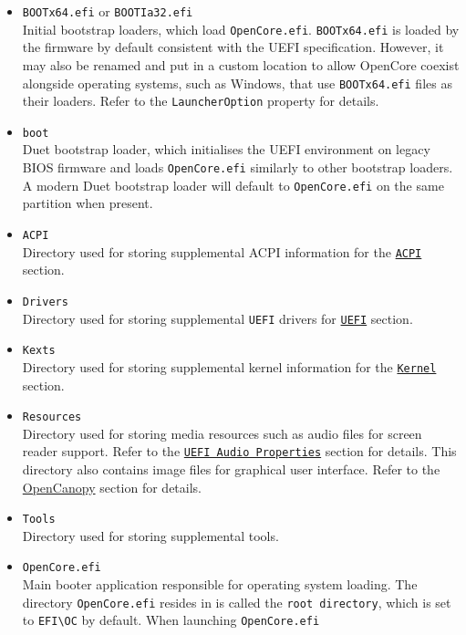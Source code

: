 \documentclass[]{article}
\providecommand{\tightlist}{%
  \setlength{\itemsep}{0pt}\setlength{\parskip}{0pt}}
\begin{document}
\begin{itemize}
\tightlist
\item
  \texttt{BOOTx64.efi} or \texttt{BOOTIa32.efi} \\
  Initial bootstrap loaders, which load \texttt{OpenCore.efi}. \texttt{BOOTx64.efi}
  is loaded by the firmware by default consistent with the UEFI specification. However,
  it may also be renamed and put in a custom location to allow OpenCore coexist alongside
  operating systems, such as Windows, that use \texttt{BOOTx64.efi} files as their loaders.
  Refer to the \texttt{LauncherOption} property for details.
\item
  \texttt{boot} \\
  Duet bootstrap loader, which initialises the UEFI environment on legacy BIOS firmware
  and loads \texttt{OpenCore.efi} similarly to other bootstrap loaders. A modern Duet
  bootstrap loader will default to \texttt{OpenCore.efi} on the same partition when
  present.
\item
  \texttt{ACPI} \\
  Directory used for storing supplemental ACPI information
  for the \hyperref[acpi]{\texttt{ACPI}} section.
\item
  \texttt{Drivers} \\
  Directory used for storing supplemental \texttt{UEFI}
  drivers for \hyperref[uefi]{\texttt{UEFI}} section.
\item
  \texttt{Kexts} \\
  Directory used for storing supplemental kernel information
  for the \hyperref[kernel]{\texttt{Kernel}} section.
\item
  \texttt{Resources} \\
  Directory used for storing media resources such as audio files
  for screen reader support. Refer to the \hyperref[uefiaudioprops]{\texttt{UEFI Audio Properties}}
  section for details. This directory also contains image files
  for graphical user interface. Refer to the \hyperref[ueficanopy]{OpenCanopy} section for details.
\item
  \texttt{Tools} \\
  Directory used for storing supplemental tools.
\item
  \texttt{OpenCore.efi} \\
  Main booter application responsible for operating system loading. The directory
  \texttt{OpenCore.efi} resides in is called the \texttt{root directory}, which is
  set to \texttt{EFI\textbackslash OC} by default. When launching \texttt{OpenCore.efi}

\end{itemize}
\end{document}
